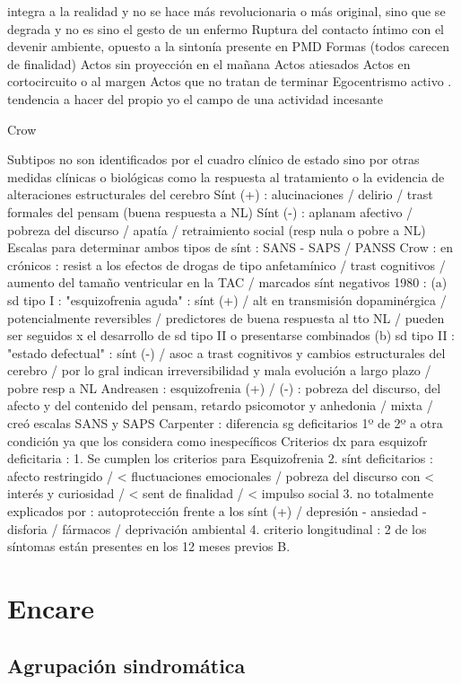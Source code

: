 integra a la realidad y no se hace más revolucionaria o más original, sino que se degrada y no es sino el gesto de un enfermo Ruptura del contacto íntimo con el devenir ambiente, opuesto a la sintonía presente en PMD Formas (todos carecen de finalidad) Actos sin proyección en el mañana Actos atiesados Actos en cortocircuito o al margen Actos que no tratan de terminar Egocentrismo activo . tendencia a hacer del propio yo el campo de una actividad incesante

Crow

Subtipos no son identificados por el cuadro clínico de estado sino por otras medidas clínicas o biológicas como la respuesta al tratamiento o la evidencia de alteraciones estructurales del cerebro Sínt (+) : alucinaciones / delirio / trast formales del pensam (buena respuesta a NL) Sínt (-) : aplanam afectivo / pobreza del discurso / apatía / retraimiento social (resp nula o pobre a NL) Escalas para determinar ambos tipos de sínt : SANS - SAPS / PANSS Crow : en crónicos : resist a los efectos de drogas de tipo anfetamínico / trast cognitivos / aumento del tamaño ventricular en la TAC / marcados sínt negativos 1980 : (a) sd tipo I : "esquizofrenia aguda" : sínt (+) / alt en transmisión dopaminérgica / potencialmente reversibles / predictores de buena respuesta al tto NL / pueden ser seguidos x el desarrollo de sd tipo II o presentarse combinados (b) sd tipo II : "estado defectual" : sínt (-) / asoc a trast cognitivos y cambios estructurales del cerebro / por lo gral indican irreversibilidad y mala evolución a largo plazo / pobre resp a NL Andreasen : esquizofrenia (+) / (-) : pobreza del discurso, del afecto y del contenido del pensam, retardo psicomotor y anhedonia / mixta / creó escalas SANS y SAPS Carpenter : diferencia sg deficitarios 1º de 2º a otra condición ya que los considera como inespecíficos Criterios dx para esquizofr deficitaria : 1. Se cumplen los criterios para Esquizofrenia 2. sínt deficitarios : afecto restringido / < fluctuaciones emocionales / pobreza del discurso con < interés y curiosidad / < sent de finalidad / < impulso social 3. no totalmente explicados por : autoprotección frente a los sínt (+) / depresión - ansiedad - disforia / fármacos / deprivación ambiental 4. criterio longitudinal : 2 de los síntomas están presentes en los 12 meses previos B.
\section*{Encare}
\subsection*{Agrupación sindromática}
